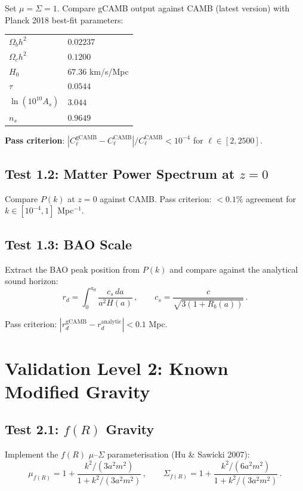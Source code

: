 \documentclass[11pt,a4paper]{article}
\begin{document}
Set $\mu = \Sigma = 1$. Compare gCAMB output against CAMB (latest version) with Planck 2018 best-fit parameters:
\begin{center}
\begin{tabular}{ll}
$\Omega_b h^2$ & $0.02237$ \\
$\Omega_c h^2$ & $0.1200$ \\
$H_0$ & $67.36$ km/s/Mpc \\
$\tau$ & $0.0544$ \\
$\ln(10^{10}A_s)$ & $3.044$ \\
$n_s$ & $0.9649$
\end{tabular}
\end{center}

\textbf{Pass criterion}: $|C_\ell^{\mathrm{gCAMB}} - C_\ell^{\mathrm{CAMB}}|/C_\ell^{\mathrm{CAMB}} < 10^{-4}$ for $\ell \in [2, 2500]$.

\subsection{Test 1.2: Matter Power Spectrum at $z = 0$}

Compare $P(k)$ at $z = 0$ against CAMB. Pass criterion: $< 0.1\%$ agreement for $k \in [10^{-4}, 1]$ Mpc$^{-1}$.

\subsection{Test 1.3: BAO Scale}

Extract the BAO peak position from $P(k)$ and compare against the analytical sound horizon:
\begin{equation}
r_d = \int_0^{a_d} \frac{c_s\,da}{a^2 H(a)}\,,\qquad c_s = \frac{c}{\sqrt{3(1 + R_b(a))}}\,.
\end{equation}

Pass criterion: $|r_d^{\mathrm{gCAMB}} - r_d^{\mathrm{analytic}}| < 0.1$ Mpc.

\section{Validation Level 2: Known Modified Gravity}

\subsection{Test 2.1: $f(R)$ Gravity}

Implement the $f(R)$ $\mu$--$\Sigma$ parameterisation (Hu \& Sawicki 2007):
\begin{equation}
\mu_{f(R)} = 1 + \frac{k^2/(3a^2 m^2)}{1 + k^2/(3a^2 m^2)}\,,\qquad \Sigma_{f(R)} = 1 + \frac{k^2/(6a^2 m^2)}{1 + k^2/(3a^2 m^2)}\,.
\end{equation}
\end{document}
